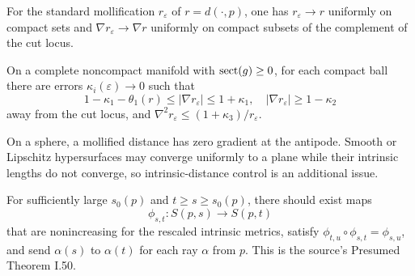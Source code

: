 \begin{lemma}
\label{lem:chow-iii-i45-mollified-distance}
For the standard mollification $r_\varepsilon$ of $r=d(\cdot,p)$, one has
$r_\varepsilon\to r$ uniformly on compact sets and
$\nabla r_\varepsilon\to\nabla r$ uniformly on compact subsets of the complement
of the cut locus.
\end{lemma}

\begin{lemma}
\label{lem:chow-iii-i47-mollified-derivatives}

On a complete noncompact manifold with $\operatorname{sect}(g)\ge0$, for each compact ball
there are errors $\kappa_i(\varepsilon)\to0$ such that
\[
1-\kappa_1-\theta_1(r)\le|\nabla r_\varepsilon|\le1+\kappa_1,
\quad |\nabla r_\varepsilon|\ge1-\kappa_2
\]
away from the cut locus, and
$\nabla^2r_\varepsilon\le(1+\kappa_3)/r_\varepsilon$.
\end{lemma}

\begin{example}
\label{ex:chow-iii-i46-i49-mollification}
On a sphere, a mollified distance has zero gradient at the antipode.  Smooth or
Lipschitz hypersurfaces may converge uniformly to a plane while their intrinsic
lengths do not converge, so intrinsic-distance control is an additional issue.
\end{example}

\begin{claim}
\label{clm:chow-iii-i50-large-sphere-maps}

For sufficiently large $s_0(p)$ and $t\ge s\ge s_0(p)$, there should exist maps
\[
\phi_{s,t}:S(p,s)\to S(p,t)
\]
that are nonincreasing for the rescaled intrinsic metrics, satisfy
$\phi_{t,u}\circ\phi_{s,t}=\phi_{s,u}$, and send $\alpha(s)$ to $\alpha(t)$
for each ray $\alpha$ from $p$.  This is the source's Presumed Theorem I.50.
\end{claim}

